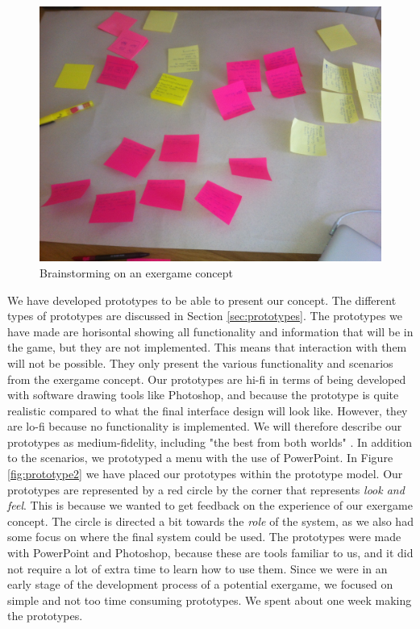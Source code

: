 \begin{figure} [H]
\centering
\includegraphics[scale=0.07]{brainstorming}
\caption[Brainstorming on an exergame concept]{Brainstorming on an exergame concept}
\label{fig:brainstorming}
\end{figure} 

We have developed prototypes to be able to present our concept. The different types of prototypes are discussed in Section \ref{sec:prototypes}. The prototypes we have made are horisontal showing all functionality and information that will be in the game, but they are not implemented. This means that interaction with them will not be possible. They only present the various functionality and scenarios from the exergame concept. Our prototypes are hi-fi in terms of being developed with software drawing tools like Photoshop, and because the prototype is quite realistic compared to what the final interface design will look like. However, they are lo-fi because no functionality is implemented. We will therefore describe our prototypes as medium-fidelity, including "the best from both worlds" \cite{mediumfidelity}. In addition to the scenarios, we prototyped a menu with the use of PowerPoint. In Figure \ref{fig:prototype2} we have placed our prototypes within the prototype model. Our prototypes are represented by a red circle by the corner that represents \emph{look and feel}. This is because we wanted to get feedback on the experience of our exergame concept. The circle is directed a bit towards the \emph{role} of the system, as we also had some focus on where the final system could be used. The prototypes were made with PowerPoint and Photoshop, because these are tools familiar to us, and it did not require a lot of extra time to learn how to use them. Since we were in an early stage of the development process of a potential exergame, we focused on simple and not too time consuming prototypes. We spent about one week making the prototypes.

